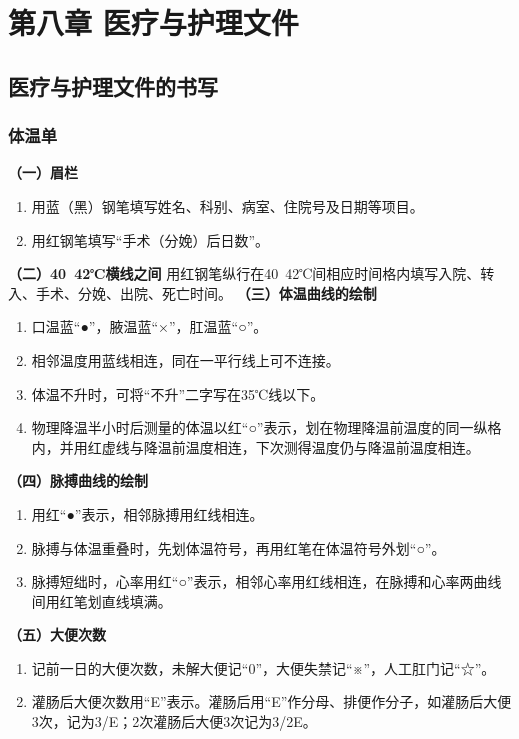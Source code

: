 \documentclass[11pt, a4paper]{ctexart}
\begin{document}
\section{第八章 医疗与护理文件}
\subsection{医疗与护理文件的书写}
\subsubsection{体温单}
\textbf{（一）眉栏}
\begin{enumerate}
    \item 用蓝（黑）钢笔填写姓名、科别、病室、住院号及日期等项目。
    \item 用红钢笔填写“手术（分娩）后日数”。
\end{enumerate}
\textbf{（二）40~42℃横线之间}
用红钢笔纵行在40~42℃间相应时间格内填写入院、转入、手术、分娩、出院、死亡时间。
\textbf{（三）体温曲线的绘制}
\begin{enumerate}
    \item 口温蓝“●”，腋温蓝“×”，肛温蓝“○”。
    \item 相邻温度用蓝线相连，同在一平行线上可不连接。
    \item 体温不升时，可将“不升”二字写在35℃线以下。
    \item 物理降温半小时后测量的体温以红“○”表示，划在物理降温前温度的同一纵格内，并用红虚线与降温前温度相连，下次测得温度仍与降温前温度相连。
\end{enumerate}
\textbf{（四）脉搏曲线的绘制}
\begin{enumerate}
    \item 用红“●”表示，相邻脉搏用红线相连。
    \item 脉搏与体温重叠时，先划体温符号，再用红笔在体温符号外划“○”。
    \item 脉搏短绌时，心率用红“○”表示，相邻心率用红线相连，在脉搏和心率两曲线间用红笔划直线填满。
\end{enumerate}
\textbf{（五）大便次数}
\begin{enumerate}
    \item 记前一日的大便次数，未解大便记“0”，大便失禁记“※”，人工肛门记“☆”。
    \item 灌肠后大便次数用“E”表示。灌肠后用“E”作分母、排便作分子，如灌肠后大便3次，记为3/E；2次灌肠后大便3次记为3/2E。
\end{enumerate}
\end{document}
